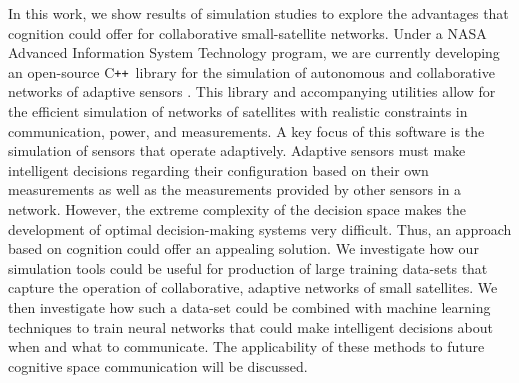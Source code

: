 \documentclass[conference]{IEEEtran}
\newcommand{\cpp}{C\texttt{++}~}
\begin{document}
In this work, we show results of simulation studies to explore the advantages that cognition could offer for collaborative small-satellite networks.  Under a NASA Advanced Information System Technology program, we are currently developing an open-source \cpp library for the simulation of autonomous and collaborative networks of adaptive sensors \cite{ref6}.  This library and accompanying utilities allow for the efficient simulation of networks of satellites with realistic constraints in communication, power, and measurements.  A key focus of this software is the simulation of sensors that operate adaptively.  Adaptive sensors must make intelligent decisions regarding their configuration based on their own measurements as well as the measurements provided by other sensors in a network.  However, the extreme complexity of the decision space makes the development of optimal decision-making systems very difficult.  Thus, an approach based on cognition could offer an appealing solution.  
%
We investigate how our simulation tools could be useful for production of large training data-sets that capture the operation of collaborative, adaptive networks of small satellites.  
We then investigate how such a data-set could be combined with machine learning techniques to train neural networks that could make intelligent decisions about when and what to communicate.  
The applicability of these methods to future cognitive space communication will be discussed.

\end{document}
